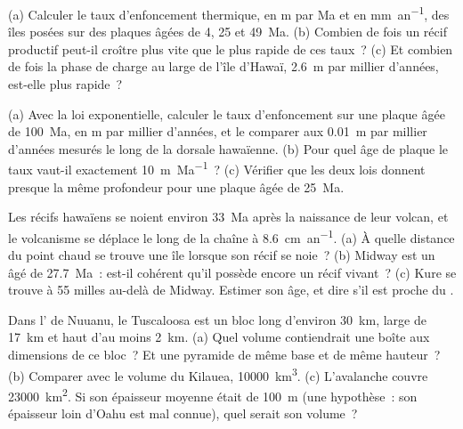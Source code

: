 \begin{exercise}[$\star\star$]\label{exo:b2:oceanic-islands:5}
(a) Calculer le taux d'enfoncement thermique, en \unit{m} par \unit{Ma} et en \unit{mm.an^{-1}},
des îles posées sur des plaques âgées de 4, 25 et \qty{49}{Ma}. (b) Combien de fois un récif
productif peut-il croître plus vite que le plus rapide de ces taux~? (c) Et combien de fois la
phase de charge au large de l'île d'Hawaï, \qty{2.6}{m} par millier d'années, est-elle plus rapide~?
\end{exercise}

\begin{exercise}[$\star\star$]\label{exo:b2:oceanic-islands:6}
(a) Avec la loi exponentielle, calculer le taux d'enfoncement sur une plaque âgée de \qty{100}{Ma}, en
\unit{m} par millier d'années, et le comparer aux \qty{0.01}{m} par millier d'années mesurés le long de
la dorsale hawaïenne. (b) Pour quel âge de plaque le taux vaut-il exactement \qty{10}{m.Ma^{-1}}~? (c)
Vérifier que les deux lois donnent presque la même profondeur pour une plaque âgée de \qty{25}{Ma}.
\end{exercise}

\begin{exercise}[$\star\star$]\label{exo:b2:oceanic-islands:7}
Les récifs hawaïens se noient environ \qty{33}{Ma} après la naissance de leur volcan, et
le volcanisme se déplace le long de la chaîne à \qty{8.6}{cm.an^{-1}}. (a) À quelle distance
du point chaud se trouve une île lorsque son récif se noie~? (b) Midway est un  âgé de
\qty{27.7}{Ma}~: est-il cohérent qu'il possède encore un récif vivant~? (c) Kure se trouve
à 55 milles au-delà de Midway. Estimer son âge, et dire s'il est proche du .
\end{exercise}

\begin{exercise}[$\star\star$]\label{exo:b2:oceanic-islands:8}
Dans l' de Nuuanu, le  Tuscaloosa est un bloc long
d'environ \qty{30}{km}, large de \qty{17}{km} et haut d'au moins \qty{2}{km}. (a) Quel
volume contiendrait une boîte aux dimensions de ce bloc~? Et une pyramide de même base
et de même hauteur~? (b) Comparer avec le volume du Kilauea, \qty{10000}{km^3}. (c)
L'avalanche couvre \qty{23000}{km^2}. Si son épaisseur moyenne était de \qty{100}{m}
(une hypothèse~: son épaisseur loin d'Oahu est mal connue), quel serait son volume~?
\end{exercise}

